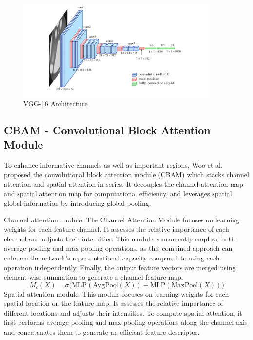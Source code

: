 \documentclass[pdflatex,sn-mathphys-num]{sn-jnl}%
\theoremstyle{thmstyleone}%
\theoremstyle{thmstyletwo}%
\theoremstyle{thmstylethree}%
\begin{document}
\begin{figure}[h]
  \centering
  \includegraphics[width=0.9\textwidth]{Figures/vgg.png}
   \caption{VGG-16 Architecture}
  \label{fig:h5}
\end{figure}

\subsection{CBAM - Convolutional Block Attention Module}
To enhance informative channels as well as important regions,
Woo et al. \cite{b7} proposed the convolutional block attention module
(CBAM) which stacks channel attention and spatial attention
in series. It decouples the channel attention map and spatial
attention map for computational efficiency, and leverages
spatial global information by introducing global pooling.

Channel attention module: The Channel Attention Module focuses on learning weights for each feature channel. It assesses the relative importance of each channel and adjusts their intensities. This module concurrently employs both average-pooling and max-pooling operations, as this combined approach can enhance the network's representational capacity compared to using each operation independently. Finally, the output feature vectors are merged using element-wise summation to generate a channel feature map.
\begin{equation}\label{eq:cbam-channel}
M_c(X) = \sigma\bigl(\mathrm{MLP}(\mathrm{AvgPool}(X)) + \mathrm{MLP}(\mathrm{MaxPool}(X))\bigr)
\end{equation}
Spatial attention module: This module focuses on learning weights for each spatial location on the feature map. It assesses the relative importance of different locations and adjusts their intensities. To compute spatial attention, it first performs average-pooling and max-pooling operations along the channel axis and concatenates them to generate an efficient feature descriptor.
\end{document}
